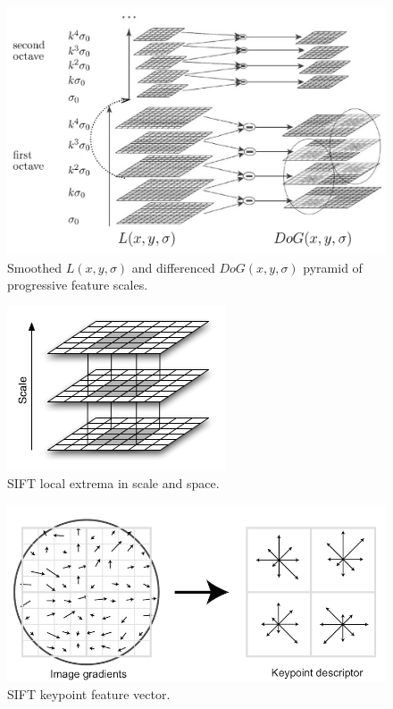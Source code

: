\begin{figure}
    \centering
    \includegraphics[width=\linewidth,keepaspectratio]{figures/pyramid.png}
    \caption{Smoothed $L(x,y, \sigma)$ and differenced $DoG(x,y,\sigma)$ pyramid of progressive feature scales\cite{younescomprehensive}.}
    \label{fig:sift_pyramid}
\end{figure}
\begin{figure}
    \centering
    \includegraphics[width=.8\linewidth,keepaspectratio]{figures/sift_extrema.png}
    \caption{SIFT local extrema in scale and space.}
    \label{fig:sift_scale}
\end{figure}
\begin{figure}
    \centering
    \includegraphics[width=\linewidth,keepaspectratio]{figures/sift_feature.png}
    \caption{SIFT keypoint feature vector\cite{phamsift}.}
    \label{fig:sift_feature}
\end{figure}
